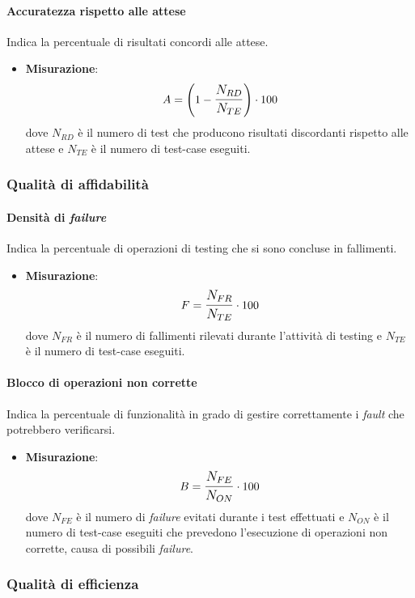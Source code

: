 \paragraph{Accuratezza rispetto alle attese}
Indica la percentuale di risultati concordi alle attese.
\begin{itemize}
	\item \textbf{Misurazione}: 
	$$A=\left(1-\mathlarger{\frac{N_{RD}}{N_{TE}}}\right) \cdot 100$$
	dove $N_{RD}$ è il numero di test che producono risultati discordanti rispetto alle attese e $N_{TE}$ è il numero di test-case eseguiti.
\end{itemize}

\subsubsection{Qualità di affidabilità}
\paragraph{Densità di \textit{failure}}
Indica la percentuale di operazioni di testing che si sono concluse in fallimenti.

\begin{itemize}
	\item \textbf{Misurazione}: 
	$$F=\mathlarger{\frac{N_{FR}}{N_{TE}}} \cdot 100$$
	dove $N_{FR}$ è il numero di fallimenti rilevati durante l'attività di testing e $N_{TE}$ è il numero di test-case eseguiti.
\end{itemize}

\paragraph{Blocco di operazioni non corrette}
Indica la percentuale di funzionalità in grado di gestire correttamente i \textit{fault} che potrebbero verificarsi.
\begin{itemize}
	\item \textbf{Misurazione}: 
	$$B=\mathlarger{\frac{N_{FE}}{N_{ON}}} \cdot 100$$
	dove $N_{FE}$ è il numero di \textit{failure} evitati durante i test effettuati e $N_{ON}$ è il numero di test-case eseguiti che prevedono l'esecuzione di operazioni non corrette, causa di possibili \textit{failure}.
\end{itemize}

\subsubsection{Qualità di efficienza}

